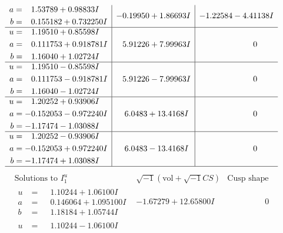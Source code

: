 \documentclass[1p]{elsarticle_modified}
\theoremstyle{definition}
\newcommand{\I}{\sqrt{-1}}
\begin{document}
$$\begin{array}{c|c|c}
\begin{aligned}
a &= \phantom{-}1.53789 + 0.98833 I \\
b &= \phantom{-}0.155182 + 0.732250 I\end{aligned}
 & -0.19950 + 1.86693 I & -1.22584 - 4.41138 I \\ \hline\begin{aligned}
u &= \phantom{-}1.19510 + 0.85598 I \\
a &= \phantom{-}0.111753 + 0.918781 I \\
b &= \phantom{-}1.16040 + 1.02724 I\end{aligned}
 & \phantom{-}5.91226 + 7.99963 I & \phantom{-0.000000 } 0 \\ \hline\begin{aligned}
u &= \phantom{-}1.19510 - 0.85598 I \\
a &= \phantom{-}0.111753 - 0.918781 I \\
b &= \phantom{-}1.16040 - 1.02724 I\end{aligned}
 & \phantom{-}5.91226 - 7.99963 I & \phantom{-0.000000 } 0 \\ \hline\begin{aligned}
u &= \phantom{-}1.20252 + 0.93906 I \\
a &= -0.152053 - 0.972240 I \\
b &= -1.17474 - 1.03088 I\end{aligned}
 & \phantom{-}6.0483 + 13.4168 I & \phantom{-0.000000 } 0 \\ \hline\begin{aligned}
u &= \phantom{-}1.20252 - 0.93906 I \\
a &= -0.152053 + 0.972240 I \\
b &= -1.17474 + 1.03088 I\end{aligned}
 & \phantom{-}6.0483 - 13.4168 I & \phantom{-0.000000 } 0\\
 \hline 
 \end{array}$$\newpage$$\begin{array}{c|c|c}  
\text{Solutions to }I^u_{1}& \I (\text{vol} + \sqrt{-1}CS) & \text{Cusp shape}\\
 \hline 
\begin{aligned}
u &= \phantom{-}1.10244 + 1.06100 I \\
a &= \phantom{-}0.146064 + 1.095100 I \\
b &= \phantom{-}1.18184 + 1.05744 I\end{aligned}
 & -1.67279 + 12.65800 I & \phantom{-0.000000 } 0 \\ \hline\begin{aligned}
u &= \phantom{-}1.10244 - 1.06100 I \\

\end{aligned}
\end{array}$$
\end{document}
